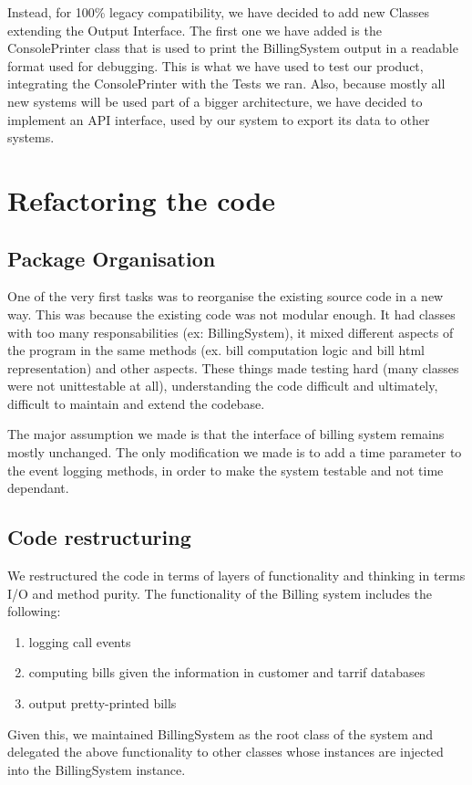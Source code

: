 \documentclass[11pt,twocolumn]{article} %
\begin{document}
Instead, for 100\% legacy compatibility, we have decided to add new Classes extending the Output Interface. 
The first one we have added is the ConsolePrinter class that is used to print the BillingSystem output in a readable format used for debugging.
This is what we have used to test our product, integrating the ConsolePrinter with the Tests we ran. Also, because mostly all new systems will be used 
part of a bigger architecture, we have decided to implement an API interface, used by our system to export its data to other systems. 




\section{Refactoring the code}

\subsection{Package Organisation}
One of the very first tasks was to reorganise the existing source code in a new way.
This was because the existing code was not modular enough. It had classes with too many responsabilities (ex: BillingSystem),
it mixed different aspects of the program in the same methods (ex. bill computation logic and bill html representation) and other aspects.
These things made testing hard (many classes were not unittestable at all), understanding the code difficult and ultimately,
difficult to maintain and extend the codebase.

The major assumption we made is that the interface of billing system remains mostly unchanged. The only modification we made is to add 
a time parameter to the event logging methods, in order to make the system testable and not time dependant.

\subsection{Code restructuring}
We restructured the code in terms of layers of functionality and thinking in terms I/O and method purity.
The functionality of the Billing system includes the following:
\begin{enumerate}
 \item{logging call events}
 \item{computing bills given the information in customer and tarrif databases}
 \item{output pretty-printed bills}
\end{enumerate}
Given this, we maintained BillingSystem as the root class of the system and delegated the above functionality to other classes whose
instances are injected into the BillingSystem instance.
\end{document}

